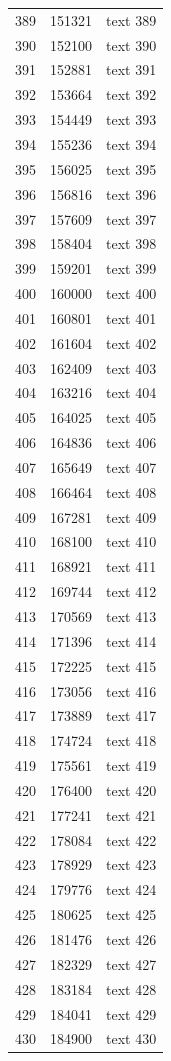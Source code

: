 \documentclass[10pt]{article}
\begin{document}
\begin{longtable}{rrl}
389&151321&text 389\\
390&152100&text 390\\
391&152881&text 391\\
392&153664&text 392\\
393&154449&text 393\\
394&155236&text 394\\
395&156025&text 395\\
396&156816&text 396\\
397&157609&text 397\\
398&158404&text 398\\
399&159201&text 399\\
400&160000&text 400\\
401&160801&text 401\\
402&161604&text 402\\
403&162409&text 403\\
404&163216&text 404\\
405&164025&text 405\\
406&164836&text 406\\
407&165649&text 407\\
408&166464&text 408\\
409&167281&text 409\\
410&168100&text 410\\
411&168921&text 411\\
412&169744&text 412\\
413&170569&text 413\\
414&171396&text 414\\
415&172225&text 415\\
416&173056&text 416\\
417&173889&text 417\\
418&174724&text 418\\
419&175561&text 419\\
420&176400&text 420\\
421&177241&text 421\\
422&178084&text 422\\
423&178929&text 423\\
424&179776&text 424\\
425&180625&text 425\\
426&181476&text 426\\
427&182329&text 427\\
428&183184&text 428\\
429&184041&text 429\\
430&184900&text 430\\

\end{longtable}
\end{document}
